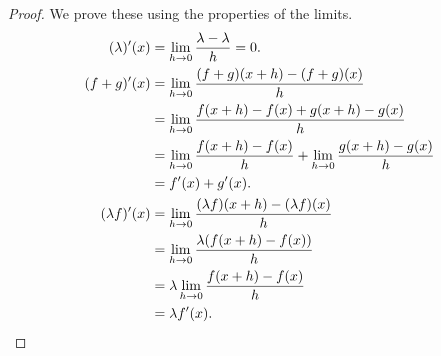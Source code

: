 \begin{proof}
  We prove these using the properties of the limits.
  \begin{align*}
      (\lambda)'(x) &= \lim_{h \to 0} \frac{\lambda - \lambda}{h} = 0.\\
      (f + g)'(x) &= \lim_{h \to 0} \frac{(f + g)(x + h) - (f + g)(x)}{h}\\
                  &= \lim_{h \to 0} \frac{f(x + h) - f(x) + g(x + h) - g(x)}{h}\\
                  &= \lim_{h \to 0} \frac{f(x + h) - f(x)}{h} + \lim_{h \to 0} \frac{g(x + h) - g(x)}{h}\\
                  &= f'(x) + g'(x).\\
      (\lambda f)'(x) &= \lim_{h \to 0} \frac{(\lambda f)(x + h) - (\lambda f)(x)}{h}\\
                      &= \lim_{h \to 0} \frac{\lambda (f(x + h) - f(x))}{h}\\
                      &= \lambda \lim_{h \to 0} \frac{f(x + h) - f(x)}{h}\\
                      &= \lambda f'(x).\qedhere
  \end{align*}
\end{proof}

